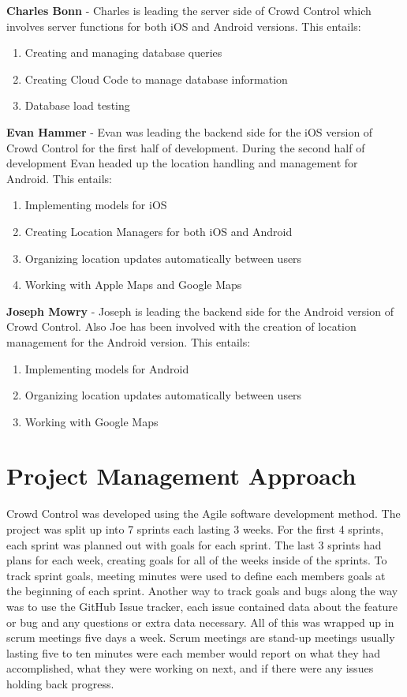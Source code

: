 \textbf{Charles Bonn} - Charles is leading the server side of Crowd Control which involves server functions for both iOS and Android versions. This entails:
	\begin{enumerate}
	\item Creating and managing database queries 
	\item Creating Cloud Code to manage database information
	\item Database load testing
	\end{enumerate}

\textbf{Evan Hammer} - Evan was leading the backend side for the iOS version of Crowd Control for the first half of development. During the second half of development Evan headed up the location handling and management for Android. This entails:
	\begin{enumerate}
		\item Implementing models for iOS
		\item Creating Location Managers for both iOS and Android
		\item Organizing location updates automatically between users
		\item Working with Apple Maps and Google Maps
	\end{enumerate}

\textbf{Joseph Mowry} - Joseph is leading the backend side for the Android version of Crowd Control. Also Joe has been involved with the creation of location management for the Android version.  This entails:

	\begin{enumerate}
		\item Implementing models for Android
		\item Organizing location updates automatically between users
		\item Working with Google Maps
	\end{enumerate}



\section{Project  Management Approach}

Crowd Control was developed using the Agile software development method.  The project was split up into 7 sprints each lasting 3 weeks.  For the first 4 sprints, each sprint was planned out with goals for each sprint.  The last 3 sprints had plans for each week, creating goals for all of the weeks inside of the sprints.  To track sprint goals, meeting minutes were used to define each members goals at the beginning of each sprint.  Another way to track goals and bugs along the way was to use the GitHub Issue tracker, each issue contained data about the feature or bug and any questions or extra data necessary.  All of this was wrapped up in scrum meetings five days a week.  Scrum meetings are stand-up meetings usually lasting five to ten minutes were each member would report on what they had accomplished, what they were working on next, and if there were any issues holding back progress.


